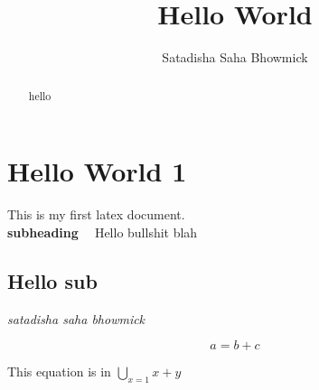 \documentclass[12pt.]{IEEEtran}
\begin{document}
\title{Hello World}
\author{Satadisha Saha Bhowmick}

\maketitle

\begin{abstract}
hello 
\end{abstract}



\section{Hello World 1}
\label{section1}
This is my first latex document. \\

\smallskip
\noindent
\textbf{subheading ~}
Hello bullshit blah


\subsection{Hello sub}

{\em satadisha saha bhowmick}

\begin{equation}
a = b+c
\end{equation}


This equation is in $\bigcup\limits_{x=1}x+y$ \cite{_concepttree}

\noindent




\end{document}

